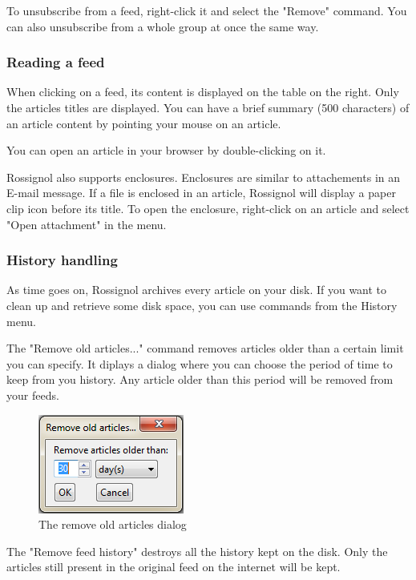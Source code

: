 \documentclass[11pt]{article} %
\begin{document}
To unsubscribe from a feed, right-click it and select the "Remove" command. You
can also unsubscribe from a whole group at once the same way. 

\subsubsection{Reading a feed}

When clicking on a feed, its content is displayed on the table on the right. 
Only the articles titles are displayed. You can have a brief summary (500 
characters) of an article content by pointing your mouse on an article.

You can open an article in your browser by double-clicking on it.

Rossignol also supports enclosures. Enclosures are similar to attachements in an 
E-mail message. If a file is enclosed in an article, Rossignol will display 
a paper clip icon before its title. To open the enclosure, right-click on 
an article and select "Open attachment" in the menu.

\subsubsection{History handling}

As time goes on, Rossignol archives every article on your disk. If you want to 
clean up and retrieve some disk space, you can use commands from the History 
menu.

The "Remove old articles..." command removes articles older than a certain limit 
you can specify. It diplays a dialog where you can choose the period of time 
to keep from you history. Any article older than this period will be removed 
from your feeds. 

\begin{figure}[h]
\centering
\includegraphics{img/remove_old_articles_dialog.png}
\caption{The remove old articles dialog}
\end{figure}

The "Remove feed history" destroys all the history kept on the disk. Only the 
articles still present in the original feed on the internet will be kept. 
\end{document}
